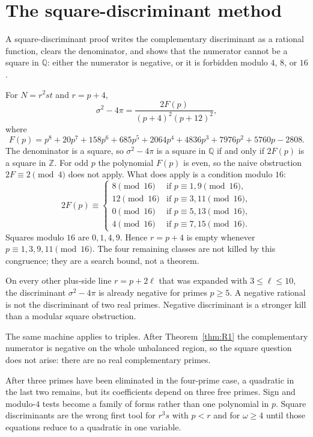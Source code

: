 \documentclass[11pt,reqno]{amsart}
\theoremstyle{definition}
\begin{document}
\section{The square-discriminant method}
\label{sec:sqdisc-reprise}

A square-discriminant proof writes the complementary discriminant as a rational function, clears the denominator, and shows that the numerator cannot be a square in \(\mathbb{Q}\): either the numerator is negative, or it is forbidden modulo \(4\), \(8\), or \(16\).

For \(N=r^2st\) and \(r=p+4\),
\[
\sigma^2-4\pi=\frac{2F(p)}{(p+4)^2(p+12)^2},
\]
where
\[
F(p)=p^8+20p^7+158p^6+685p^5+2064p^4+4836p^3+7976p^2+5760p-2808.
\]
The denominator is a square, so \(\sigma^2-4\pi\) is a square in \(\mathbb{Q}\) if and only if \(2F(p)\) is a square in \(\mathbb{Z}\). For odd \(p\) the polynomial \(F(p)\) is even, so the naive obstruction \(2F\equiv 2\pmod{4}\) does not apply. What does apply is a condition modulo \(16\):
\[
2F(p)\equiv
\begin{cases}
8\pmod{16}&\text{if }p\equiv 1,9\pmod{16},\\
12\pmod{16}&\text{if }p\equiv 3,11\pmod{16},\\
0\pmod{16}&\text{if }p\equiv 5,13\pmod{16},\\
4\pmod{16}&\text{if }p\equiv 7,15\pmod{16}.
\end{cases}
\]
Squares modulo \(16\) are \(0,1,4,9\). Hence \(r=p+4\) is empty whenever \(p\equiv 1,3,9,11\pmod{16}\). The four remaining classes are not killed by this congruence; they are a search bound, not a theorem.

On every other plus-side line \(r=p+2\ell\) that was expanded with \(3\le\ell\le 10\), the discriminant \(\sigma^2-4\pi\) is already negative for primes \(p\ge 5\). A negative rational is not the discriminant of two real primes. Negative discriminant is a stronger kill than a modular square obstruction.

The same machine applies to triples. After Theorem~\ref{thm:R1} the complementary numerator is negative on the whole unbalanced region, so the square question does not arise: there are no real complementary primes.

After three primes have been eliminated in the four-prime case, a quadratic in the last two remains, but its coefficients depend on three free primes. Sign and modulo-\(4\) tests become a family of forms rather than one polynomial in \(p\). Square discriminants are the wrong first tool for \(r^3s\) with \(p<r\) and for \(\omega\ge 4\) until those equations reduce to a quadratic in one variable.
\end{document}
